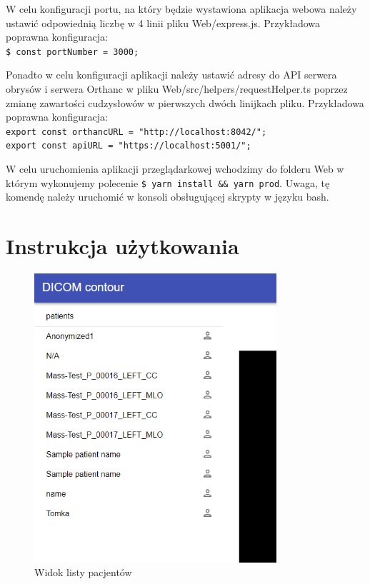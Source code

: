 \documentclass[a4paper,11pt,twoside,openright]{report}
\theoremstyle{definition}
\begin{document}
W celu konfiguracji portu, na który będzie wystawiona aplikacja webowa należy ustawić odpowiednią liczbę w 4 linii pliku Web/express.js. Przykładowa poprawna konfiguracja:\\
\texttt{\$ const portNumber = 3000;}

Ponadto w celu konfiguracji aplikacji należy ustawić adresy do API serwera obrysów i serwera Orthanc w pliku Web/src/helpers/requestHelper.ts poprzez zmianę zawartości cudzysłowów w pierwszych dwóch linijkach pliku. 	Przykładowa poprawna konfiguracja:\\
\texttt{export const orthancURL = "http://localhost:8042/";}\\
\texttt{export const apiURL = "https://localhost:5001/";}

W celu uruchomienia aplikacji przeglądarkowej wchodzimy do folderu Web w którym wykonujemy polecenie \texttt{\$ yarn install \&\& yarn prod}. Uwaga, tę komendę należy uruchomić w konsoli obsługującej skrypty w języku bash.




\chapter*{Instrukcja użytkowania}

\begin{figure}[h!]
	\center
	\includegraphics[width=0.8\textwidth]{1}
	\caption{Widok listy pacjentów}
    	\label{fig:1}
\end{figure}
\end{document}
